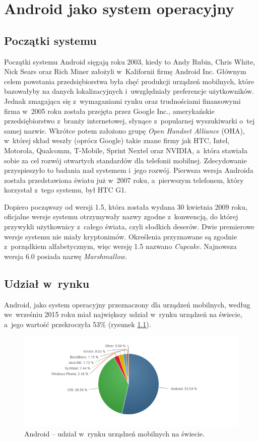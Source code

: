 \chapter{Android jako system operacyjny}

\section{Początki systemu}
Początki systemu Android sięgają roku 2003, kiedy to Andy Rubin, Chris White, Nick Sears oraz Rich Miner założyli w~Kalifornii firmę Android Inc. Głównym celem powstania przedsiębiorstwa była chęć produkcji urządzeń mobilnych, które bazowałyby na danych lokalizacyjnych i~uwzględniały preferencje użytkowników. Jednak zmagająca się z~wymaganiami rynku oraz trudnościami finansowymi firma w~2005 roku została przejęta przez Google Inc., amerykańskie przedsiębiorstwo z~branży internetowej, słynące z~popularnej wyszukiwarki o~tej samej nazwie. Wkrótce potem założono grupę \textit{Open Handset Alliance} (OHA), w~której skład weszły (oprócz Google) takie znane firmy jak HTC, Intel, Motorola, Qualcomm, T-Mobile, Sprint Nextel oraz NVIDIA, a~która stawiała sobie za cel rozwój otwartych standardów dla telefonii mobilnej. Zdecydowanie przyspieszyło to badania nad systemem i~jego rozwój. Pierwsza wersja Androida została przedstawiona światu już w~2007 roku, a~pierwszym telefonem, który korzystał z~tego systemu, był HTC G1.

Dopiero począwszy od wersji 1.5, która została wydana 30 kwietnia 2009 roku, oficjalne wersje systemu otrzymywały nazwy zgodne z~konwencją, do której przywykli użytkownicy z~całego świata, czyli słodkich deserów. Dwie premierowe wersje systemu nie miały kryptonimów. Określenia przyznawane są zgodnie z~porządkiem alfabetycznym, więc wersję 1.5 nazwano \textit{Cupcake}. Najnowsza wersja 6.0 posiada nazwę \textit{Marshmallow}.

\section{Udział w~rynku}
Android, jako system operacyjny przeznaczony dla urządzeń mobilnych, według \cite{website:android:stat2} we~wrześniu 2015 roku miał największy udział w~rynku urządzeń na świecie, a~jego wartość przekroczyła 53\% (rysunek \ref{fig:android_udzial_zagranica}).

\newpage
\begin{figure}[!htb]
    \centering
    \includegraphics[width=17cm]{imgs/ch2_android_udzial_2.png}
    \caption
{Android – udział w~rynku urządzeń mobilnych na świecie\cite{website:android:stat2}.}
    \label{fig:android_udzial_zagranica}
\end{figure} 

